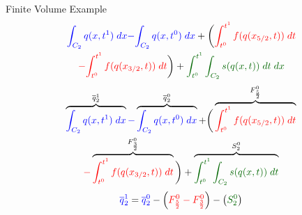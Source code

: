 \documentclass[]{beamer}
\begin{document}
\begin{frame}{Finite Volume Example}	
	\begin{multline*}
	{ {\color{blue}\int_{C_2} q(x,t^1) \; dx}} {\color{blue}-} { {\color{blue}\int_{C_2} q(x,t^0) \; dx } } +  \bigg(  {\color{red}\int_{t^0}^{t^1} f(q(x_{5/2},t)) \; dt} \\ {\color{red}-} {{\color{red}\int_{t^0}^{t^1} f(q(x_{3/2},t)) \; dt}}\bigg) +  { {\color{green!40!black}\int_{t^0}^{t^1} \int_{C_2} s(q(x,t)) \; dt \; dx }}
	\end{multline*}
	\pause
	\begin{multline*}
	\overbrace{ {\color{blue}\int_{C_2} q(x,t^1) \; dx}}^{\overline{q}^1_2} {\color{blue}-} \overbrace{ {\color{blue}\int_{C_2} q(x,t^0) \; dx } }^{\overline{q}^0_2} +  \bigg( \overbrace{ {\color{red}\int_{t^0}^{t^1} f(q(x_{5/2},t)) \; dt}}^{F^0_{\frac{5}{2}}} \\ {\color{red}-} \overbrace{{\color{red}\int_{t^0}^{t^1} f(q(x_{3/2},t)) \; dt}}^{F^0_{\frac{3}{2}}}  \bigg) +  \overbrace{ {\color{green!40!black}\int_{t^0}^{t^1} \int_{C_2} s(q(x,t)) \; dt }}^{S^0_{2}}
	\end{multline*}
	\pause 
	\begin{equation*}
	{\color{blue}\overline{q}^1_2 } = {\color{blue}\overline{q}^0_2} - \left(  {\color{red}F^0_{\frac{5}{2}} - F^0_{\frac{3}{2}} } \right) -  \left({\color{green!40!black}S^0_2}\right)
	\end{equation*}	
\end{frame}
\end{document}
